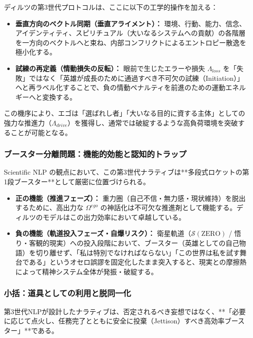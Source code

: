 ディルツの第3世代プロトコルは、ここに以下の工学的操作を加える：
\begin{itemize}
    \item \textbf{垂直方向のベクトル同期（垂直アライメント）：}
    環境、行動、能力、信念、アイデンティティ、スピリチュアル（大いなるシステムへの貢献）の各階層を一方向のベクトルへと束ね、内部コンフリクトによるエントロピー散逸を極小化する。
    \item \textbf{試練の再定義（情動損失の反転）：}
    眼前で生じたエラーや損失 $\Lambda_{loss}$ を「失敗」ではなく「英雄が成長のために通過すべき不可欠の試練（Initiation）」へと再ラベル化することで、負の情動ペナルティを前進のための運動エネルギーへと変換する。
\end{itemize}

この機序により、エゴは「選ばれし者」「大いなる目的に資する主体」としての強力な推進力（$\Lambda_{drive}$）を獲得し、通常では破綻するような高負荷環境を突破することが可能となる。

\subsubsection{ブースター分離問題：機能的効能と認知的トラップ}
Scientific NLP の観点において、この第3世代ナラティブは**多段式ロケットの第1段ブースター**として厳密に位置づけられる。

\begin{tcolorbox}[colback=blue!5,colframe=blue!60,title=工学的トレードオフ：ナラティブ・インジェクションの功罪]
\begin{itemize}
    \item \textbf{正の機能（推進フェーズ）：}
    重力圏（自己不信・無力感・現状維持）を脱出するために、高出力な $\Omega^{ego}$ の神話化は不可欠な推進剤として機能する。ディルツのモデルはこの出力効率において卓越している。
    \item \textbf{負の機能（軌道投入フェーズ・自爆リスク）：}
    衛星軌道（$\mathcal{S}(\text{ZERO})$ / 悟り・客観的現実）への投入段階において、ブースター（英雄としての自己物語）を切り離せず、「私は特別でなければならない」「この世界は私を試す舞台である」というオセロ誤謬を固定化したまま突入すると、現実との摩擦熱によって精神システム全体が発振・破綻する。
\end{itemize}
\end{tcolorbox}

\subsubsection{小括：道具としての利用と脱同一化}
第3世代NLPが設計したナラティブは、否定されるべき妄想ではなく、**「必要に応じて点火し、任務完了とともに安全に投棄（Jettison）すべき高効率ブースター」**である。

